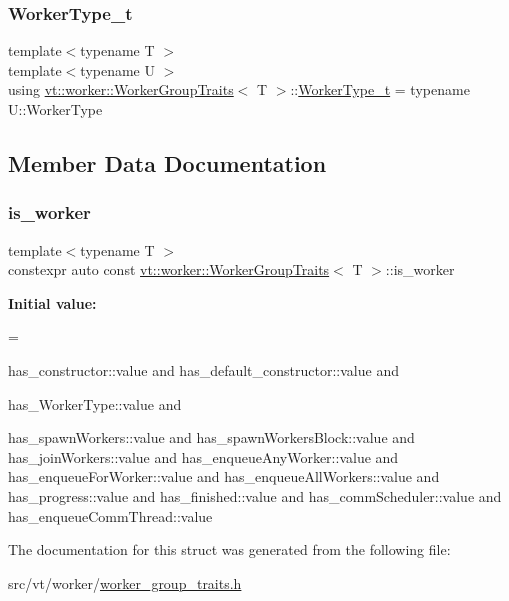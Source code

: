 \mbox{\label{structvt_1_1worker_1_1_worker_group_traits_a977cb0db3e7ff57c4eb45f6ca2cdd38c}} 
\subsubsection{\texorpdfstring{Worker\+Type\+\_\+t}{WorkerType\_t}}
{\footnotesize\ttfamily template$<$typename T $>$ \\
template$<$typename U $>$ \\
using \hyperlink{structvt_1_1worker_1_1_worker_group_traits}{vt\+::worker\+::\+Worker\+Group\+Traits}$<$ T $>$\+::\hyperlink{structvt_1_1worker_1_1_worker_group_traits_a977cb0db3e7ff57c4eb45f6ca2cdd38c}{Worker\+Type\+\_\+t} =  typename U\+::\+Worker\+Type}



\subsection{Member Data Documentation}
\mbox{\label{structvt_1_1worker_1_1_worker_group_traits_ad95cbaac5da30e1904ed5ad8b7f61edc}} 
\subsubsection{\texorpdfstring{is\+\_\+worker}{is\_worker}}
{\footnotesize\ttfamily template$<$typename T $>$ \\
constexpr auto const \hyperlink{structvt_1_1worker_1_1_worker_group_traits}{vt\+::worker\+::\+Worker\+Group\+Traits}$<$ T $>$\+::is\+\_\+worker\hspace{0.3cm}{\ttfamily [static]}}

{\bfseries Initial value\+:}
\begin{DoxyCode}
=
    
    has\_constructor::value and has\_default\_constructor::value and
    
    has\_WorkerType::value and
    
    
    has\_spawnWorkers::value and has\_spawnWorkersBlock::value and
    has\_joinWorkers::value and has\_enqueueAnyWorker::value and
    has\_enqueueForWorker::value and has\_enqueueAllWorkers::value and
    has\_progress::value and has\_finished::value and has\_commScheduler::value and
    has\_enqueueCommThread::value
\end{DoxyCode}


The documentation for this struct was generated from the following file\+:\begin{DoxyCompactItemize}
\item 
src/vt/worker/\hyperlink{worker__group__traits_8h}{worker\+\_\+group\+\_\+traits.\+h}\end{DoxyCompactItemize}
